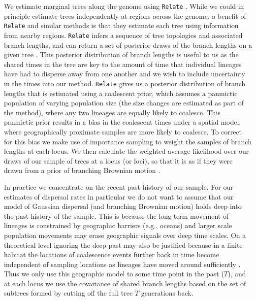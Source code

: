 \documentclass[12pt]{article}
\begin{document}
We estimate marginal trees along the genome using \texttt{Relate} \citep{speidel2019method}. While we could in principle estimate trees independently at regions across the genome, a benefit of \texttt{Relate} and similar methods is that they estimate each tree using information from nearby regions. \texttt{Relate} infers a sequence of tree topologies and associated branch lengths, and can return a set of posterior draws of the branch lengths on a given tree \citep[it was the only method that did so for a large number of samples when we began this work, but now see][]{wohns2021unified,deng2024robust}. This posterior distribution of branch lengths is useful to us as the shared times in the tree are key to the amount of time that individual lineages have had to disperse away from one another and we wish to include uncertainty in the times into our method. \texttt{Relate} gives us a posterior distribution of branch lengths that is estimated using a coalescent prior, which assumes a panmictic population of varying population size (the size changes are estimated as part of the method), where any two lineages are equally likely to coalesce. This panmictic prior results in a bias in the coalescent times under a spatial model, where geographically proximate samples are more likely to coalesce. To correct for this bias we make use of importance sampling to weight the samples of branch lengths at each locus. We then calculate the weighted average likelihood over our draws of our sample of trees at a locus (or loci), so that it is as if they were drawn from a prior of branching Brownian motion \citep{meligkotsidou2007postprocessing}. 

In practice we concentrate on the recent past history of our sample. For our estimates of dispersal rates in particular we do not want to assume that our model of Gaussian dispersal (and branching Brownian motion) holds deep into the past history of the sample. This is because the long-term movement of lineages is constrained by geographic barriers (e.g., oceans) and larger scale population movements may erase geographic signals over deep time scales. On a theoretical level ignoring the deep past may also be justified because in a finite habitat the locations of coalescence events further back in time become independent of sampling locations as lineages have moved around sufficiently \citep{wilkins2002coalescent}. Thus we only use this geographic model to some time point in the past ($T$), and at each locus we use the covariance of shared branch lengths based on the set of subtrees formed by cutting off the full tree $T$ generations back. 
\end{document}
